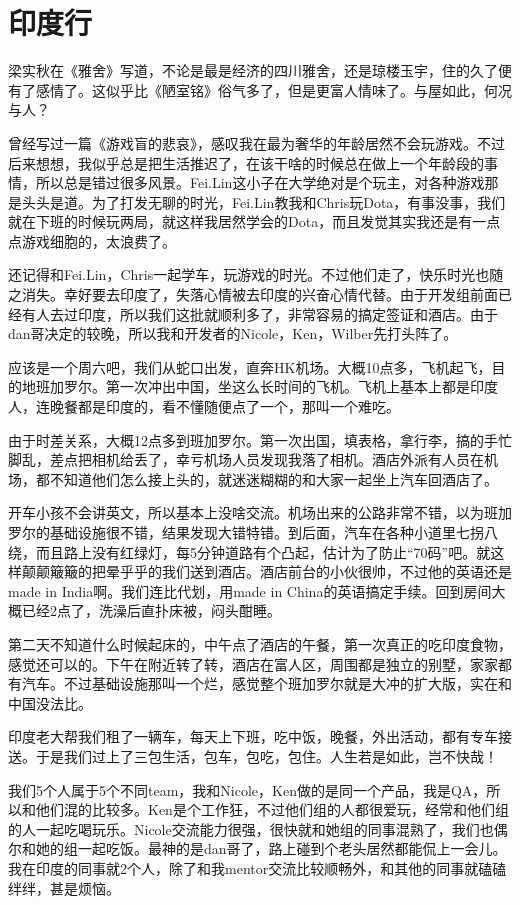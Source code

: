 \section*{印度行}

梁实秋在《雅舍》写道，不论是最是经济的四川雅舍，还是琼楼玉宇，住的久了便有了感情了。这似乎比《陋室铭》俗气多了，但是更富人情味了。与屋如此，何况与人？

曾经写过一篇《游戏盲的悲哀》，感叹我在最为奢华的年龄居然不会玩游戏。不过后来想想，我似乎总是把生活推迟了，在该干啥的时候总在做上一个年龄段的事情，所以总是错过很多风景。Fei.Lin这小子在大学绝对是个玩主，对各种游戏那是头头是道。为了打发无聊的时光，Fei.Lin教我和Chris玩Dota，有事没事，我们就在下班的时候玩两局，就这样我居然学会的Dota，而且发觉其实我还是有一点点游戏细胞的，太浪费了。

还记得和Fei.Lin，Chris一起学车，玩游戏的时光。不过他们走了，快乐时光也随之消失。幸好要去印度了，失落心情被去印度的兴奋心情代替。由于开发组前面已经有人去过印度，所以我们这批就顺利多了，非常容易的搞定签证和酒店。由于dan哥决定的较晚，所以我和开发者的Nicole，Ken，Wilber先打头阵了。

应该是一个周六吧，我们从蛇口出发，直奔HK机场。大概10点多，飞机起飞，目的地班加罗尔。第一次冲出中国，坐这么长时间的飞机。飞机上基本上都是印度人，连晚餐都是印度的，看不懂随便点了一个，那叫一个难吃。

由于时差关系，大概12点多到班加罗尔。第一次出国，填表格，拿行李，搞的手忙脚乱，差点把相机给丢了，幸亏机场人员发现我落了相机。酒店外派有人员在机场，都不知道他们怎么接上头的，就迷迷糊糊的和大家一起坐上汽车回酒店了。

开车小孩不会讲英文，所以基本上没啥交流。机场出来的公路非常不错，以为班加罗尔的基础设施很不错，结果发现大错特错。到后面，汽车在各种小道里七拐八绕，而且路上没有红绿灯，每5分钟道路有个凸起，估计为了防止“70码”吧。就这样颠颠簸簸的把晕乎乎的我们送到酒店。酒店前台的小伙很帅，不过他的英语还是made in India啊。我们连比代划，用made in China的英语搞定手续。回到房间大概已经2点了，洗澡后直扑床被，闷头酣睡。

第二天不知道什么时候起床的，中午点了酒店的午餐，第一次真正的吃印度食物，感觉还可以的。下午在附近转了转，酒店在富人区，周围都是独立的别墅，家家都有汽车。不过基础设施那叫一个烂，感觉整个班加罗尔就是大冲的扩大版，实在和中国没法比。

印度老大帮我们租了一辆车，每天上下班，吃中饭，晚餐，外出活动，都有专车接送。于是我们过上了三包生活，包车，包吃，包住。人生若是如此，岂不快哉！

我们5个人属于5个不同team，我和Nicole，Ken做的是同一个产品，我是QA，所以和他们混的比较多。Ken是个工作狂，不过他们组的人都很爱玩，经常和他们组的人一起吃喝玩乐。Nicole交流能力很强，很快就和她组的同事混熟了，我们也偶尔和她的组一起吃饭。最神的是dan哥了，路上碰到个老头居然都能侃上一会儿。我在印度的同事就2个人，除了和我mentor交流比较顺畅外，和其他的同事就磕磕绊绊，甚是烦恼。

